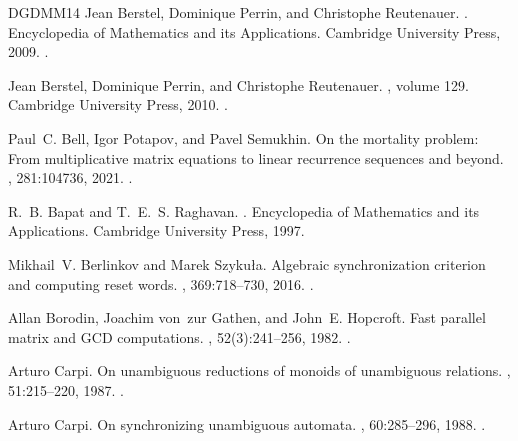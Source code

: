 \documentclass[11pt,a4paper]{amsart}
\theoremstyle{plain}
\theoremstyle{definition}
\theoremstyle{defC}
\theoremstyle{thmC}
\theoremstyle{plain}
\numberwithin{equation}{section}
\begin{document}
\begin{thebibliography}{DGDMM14}
Jean Berstel, Dominique Perrin, and Christophe Reutenauer.
.
\newblock Encyclopedia of Mathematics and its Applications. Cambridge
  University Press, 2009.
\newblock \href {https://doi.org/10.1017/CBO9781139195768}
  {}.

Jean Berstel, Dominique Perrin, and Christophe Reutenauer.
, volume 129.
\newblock Cambridge University Press, 2010.
\newblock \href {https://doi.org/10.1017/CBO9781139195768}
  {}.

Paul~C. Bell, Igor Potapov, and Pavel Semukhin.
\newblock On the mortality problem: From multiplicative matrix equations to
  linear recurrence sequences and beyond.
, 281:104736, 2021.
\newblock \href {https://doi.org/10.1016/J.IC.2021.104736}
  {}.

R.~B. Bapat and T.~E.~S. Raghavan.
.
\newblock Encyclopedia of Mathematics and its Applications. Cambridge
  University Press, 1997.

Mikhail~V. Berlinkov and Marek Szyku{\l}a.
\newblock Algebraic synchronization criterion and computing reset words.
, 369:718--730, 2016.
\newblock \href {https://doi.org/10.1016/J.INS.2016.07.049}
  {}.

Allan Borodin, Joachim von~zur Gathen, and John~E. Hopcroft.
\newblock Fast parallel matrix and {GCD} computations.
, 52(3):241--256, 1982.
\newblock \href {https://doi.org/10.1016/S0019-9958(82)90766-5}
  {}.

Arturo Carpi.
\newblock On unambiguous reductions of monoids of unambiguous relations.
, 51:215--220, 1987.
\newblock \href {https://doi.org/10.1016/0304-3975(87)90055-7}
  {}.

Arturo Carpi.
\newblock On synchronizing unambiguous automata.
, 60:285--296, 1988.
\newblock \href {https://doi.org/10.1016/0304-3975(88)90114-4}
  {}.


\end{thebibliography}
\end{document}
